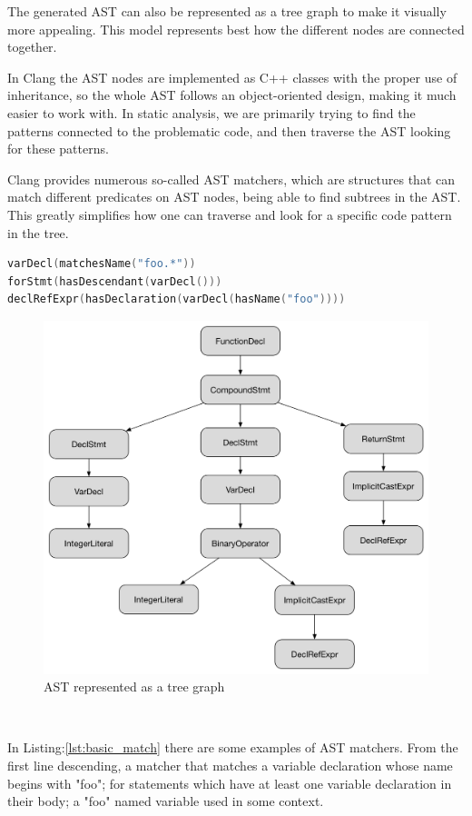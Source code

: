 \par The generated AST can also be represented as a tree graph to make it visually more appealing. This model represents best how the different nodes are connected together. \medskip
\par In Clang the AST nodes are implemented as C++ classes with the proper use of inheritance, so the whole AST follows an object-oriented design, making it much easier to work with. In static analysis, we are primarily trying to find the patterns connected to the problematic code, and then traverse the AST looking for these patterns. \medskip
\par Clang provides numerous so-called AST matchers\cite{ast_reference}, which are structures that can match different predicates on AST nodes, being able to find subtrees in the AST. This greatly simplifies how one can traverse and look for a specific code pattern in the tree.
\begin{lstlisting}[language=c++,frame=single, caption={Basic AST matchers}, style=ast, label={lst:basic_match}]
varDecl(matchesName("foo.*"))
forStmt(hasDescendant(varDecl()))
declRefExpr(hasDeclaration(varDecl(hasName("foo"))))
\end{lstlisting}
\begin{figure}[h]
	\centering
	\caption{AST represented as a tree graph}
	\includegraphics[scale = 0.4]{images/ast_diagram}
\end{figure}\
\par In Listing:\ref{lst:basic_match} there are some examples of AST matchers.  From the first line descending, a matcher that matches a variable declaration whose name begins with "foo"; for statements which have at least one variable declaration in their body; a "foo" named variable used in some context.
